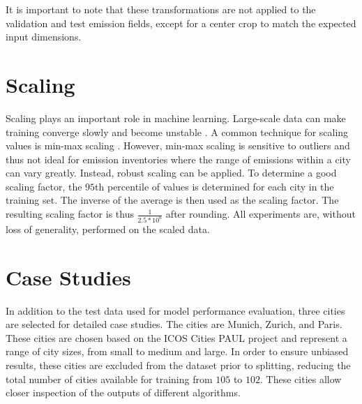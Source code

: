 It is important to note that these transformations are not applied to the validation and test emission fields, except for a center crop to match the expected input dimensions.

\section{Scaling}
Scaling plays an important role in machine learning.
Large-scale data can make training converge slowly and become unstable \parencite{DataScaling}.
A common technique for scaling values is min-max scaling \parencite{MinMaxScaling}.
However, min-max scaling is sensitive to outliers and thus not ideal for emission inventories where the range of emissions within a city can vary greatly.
Instead, robust scaling can be applied.
To determine a good scaling factor, the $95$th percentile of values is determined for each city in the training set.
The inverse of the average is then used as the scaling factor.
The resulting scaling factor is thus $\frac{1}{2.5 * 10^6}$ after rounding.
All experiments are, without loss of generality, performed on the scaled data.

\section{Case Studies}
In addition to the test data used for model performance evaluation, three cities are selected for detailed case studies.
The cities are Munich, Zurich, and Paris.
These cities are chosen based on the ICOS Cities PAUL project \parencite{Icos} and represent a range of city sizes, from small to medium and large.
In order to ensure unbiased results, these cities are excluded from the dataset prior to splitting, reducing the total number of cities available for training from $105$ to $102$.
These cities allow closer inspection of the outputs of different algorithms.

